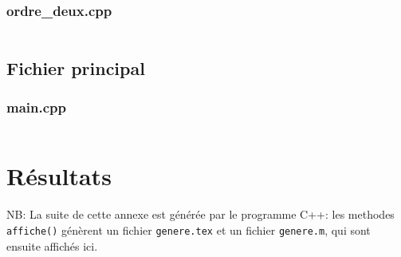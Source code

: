 \documentclass{report}
\begin{document}
\subsection{ordre\_deux.cpp}
\inputminted[linenos,fontsize=\scriptsize]{c++}{../src/source.cpp}

\section{Fichier principal}
\subsection{main.cpp}
\inputminted[linenos,fontsize=\scriptsize]{c++}{../src/main.cpp}


\chapter{Résultats}
\label{resultats}
NB: La suite de cette annexe est générée par le programme C++: les methodes \verb|affiche()| génèrent
un fichier \verb|genere.tex| et un fichier \verb|genere.m|, qui sont ensuite affichés ici.

\end{document}
